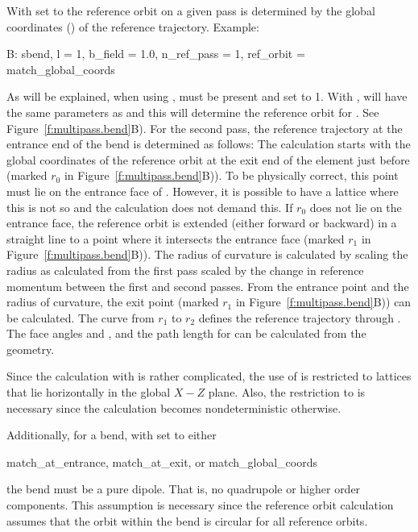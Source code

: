 With  set to  the reference
orbit on a given pass is determined by the global coordinates
() of the reference trajectory. Example:
\begin{example} 
  B: sbend, l = 1, b_field = 1.0, n_ref_pass = 1, ref_orbit = match_global_coords
\end{example}
As will be explained, when using ,
 must be present and set to 1. With
,  will have the same parameters as
 and this will determine the reference orbit for . See
Figure~\ref{f:multipass.bend}B). For the second pass, the reference
trajectory at the entrance end of the bend is determined as follows:
The calculation starts with the global coordinates of the reference
orbit at the exit end of the element just before  (marked
$r_0$ in Figure~\ref{f:multipass.bend}B)). To be physically correct,
this point must lie on the entrance face of . However, it is
possible to have a lattice where this is not so and the calculation
does not demand this. If $r_0$ does not lie on the entrance face, the
reference orbit is extended (either forward or backward) in a straight
line to a point where it intersects the entrance face (marked $r_1$ in
Figure~\ref{f:multipass.bend}B)). The radius of curvature is
calculated by scaling the radius as calculated from the first pass
scaled by the change in reference momentum between the first and
second passes. From the entrance point and the radius of curvature,
the exit point (marked $r_1$ in Figure~\ref{f:multipass.bend}B)) can
be calculated. The curve from $r_1$ to $r_2$ defines the reference
trajectory through . The face angles  and , and
the path length  for  can be calculated from the
geometry.

Since the calculation with  is rather
complicated, the use of  is restricted to
lattices that lie horizontally in the global $X-Z$ plane. Also, the
restriction to  is necessary since the calculation
becomes nondeterministic otherwise. 

Additionally, for a bend, with  set to either
\begin{example}
  match_at_entrance,
  match_at_exit, or
  match_global_coords
\end{example}
the bend must be a pure dipole. That is, no quadrupole or higher order
components. This assumption is necessary since the reference orbit
calculation assumes that the orbit within the bend is circular for all
reference orbits.

